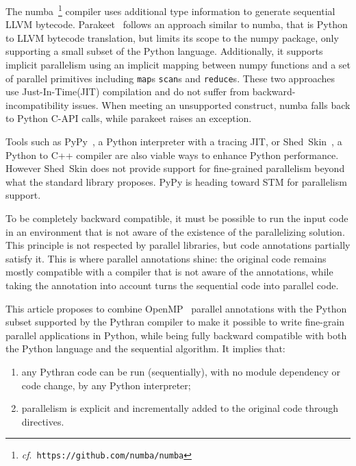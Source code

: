 \documentclass[conference]{IEEEtran}
\begin{document}
The numba~\footnote{\emph{cf}.\ \texttt{https://github.com/numba/numba}}
compiler uses additional type information to generate sequential LLVM bytecode.
Parakeet~\cite{parakeet2012} follows an approach similar to numba, that is
Python to LLVM bytecode translation, but limits its scope to the numpy package,
only supporting a small subset of the Python language. Additionally, it supports
implicit parallelism using an implicit mapping between numpy functions and a set
of parallel primitives including \texttt{map}s \texttt{scan}s and
\texttt{reduce}s. These two approaches use Just-In-Time(JIT) compilation and do
not suffer from backward-incompatibility issues. When meeting an unsupported
construct, numba falls back to Python C-API calls, while parakeet raises an
exception.

Tools such as PyPy~\cite{pypy2009}, a Python interpreter with a tracing JIT, or
Shed~Skin~\cite{shedskin2006}, a Python to C++ compiler are also viable ways to
enhance Python performance. However Shed~Skin does not provide support for
fine-grained parallelism beyond what the standard library proposes. PyPy is
heading toward STM for parallelism support.

To be completely backward compatible, it must be possible to run the input code
in an environment that is not aware of the existence of the parallelizing
solution. This principle is not respected by parallel libraries, but code
annotations partially satisfy it. This is where parallel annotations shine: the
original code remains mostly compatible with a compiler that is not aware of the
annotations, while taking the annotation into account turns the sequential code
into parallel code.

This article proposes to combine OpenMP~\cite{openmp3.1} parallel annotations
with the Python subset supported by the Pythran compiler to make it possible to
write fine-grain parallel applications in Python, while being fully backward
compatible with both the Python language and the sequential algorithm. It 
implies that:

\begin{enumerate}

    \item any Pythran code can be run (sequentially), with no module dependency
        or code change, by any Python interpreter;

    \item parallelism is explicit and incrementally added to the original code
        through directives.

\end{enumerate}
\end{document}
